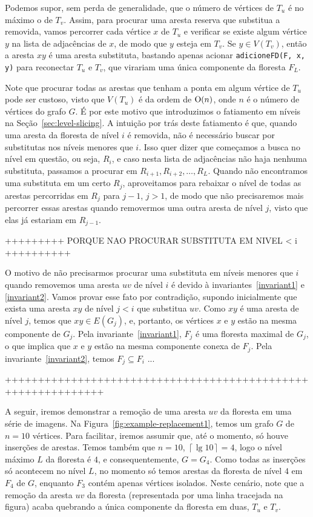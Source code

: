 Podemos supor, sem perda de generalidade, que o número de vértices de $T_u$ é no máximo o de $T_v$. Assim, para procurar uma aresta reserva que substitua a removida, vamos percorrer cada vértice $x$ de $T_u$ e verificar se existe algum vértice $y$ na lista de adjacências de $x$, de modo que $y$ esteja em $T_v$. Se $y \in V(T_v)$, então a aresta $xy$ é uma aresta substituta, bastando apenas acionar \texttt{adicioneFD(F, x, y)} para reconectar $T_u$ e $T_v$, que virariam uma única componente da floresta $F_L$.

Note que procurar todas as arestas que tenham a ponta em algum vértice de $T_u$ pode ser custoso, visto que $V(T_u)$ é da ordem de $\mathrm{O}(n)$, onde $n$ é o número de vértices do grafo $G$. É por este motivo que introduzimos o fatiamento em níveis na Seção~\ref{sec:level-slicing}. A intuição por trás deste fatiamento é que, quando uma aresta da floresta de nível $i$ é removida, não é necessário buscar por substitutas nos níveis menores que $i$. Isso quer dizer que começamos a busca no nível em questão, ou seja, $R_i$, e caso nesta lista de adjacências não haja nenhuma substituta, passamos a procurar em $R_{i+1}, R_{i + 2}, \ldots, R_L$. Quando não encontramos uma substituta em um certo $R_j$, aproveitamos para rebaixar o nível de todas as arestas percorridas em $R_j$ para $j - 1$, $j > 1$, de modo que não precisaremos mais percorrer essas arestas quando removermos uma outra aresta de nível $j$, visto que elas já estariam em $R_{j-1}$.

+++++++++ PORQUE NAO PROCURAR SUBSTITUTA EM NIVEL < i ++++++++++

O motivo de não precisarmos procurar uma substituta em níveis menores que $i$ quando removemos uma aresta $uv$ de nível $i$ é devido à invariantes~\ref{invariant1} e \ref{invariant2}. Vamos provar esse fato por contradição, supondo inicialmente que exista uma aresta $xy$ de nível $j < i$ que substitua $uv$. Como $xy$ é uma aresta de nível $j$, temos que $xy \in E(G_{j})$, e, portanto, os vértices $x$ e $y$ estão na mesma componente de $G_j$. Pela invariante~\ref{invariant1}, $F_j$ é uma floresta maximal de $G_j$, o que implica que $x$ e $y$ estão na mesma componente conexa de $F_j$. Pela invariante~\ref{invariant2}, temos $F_{j} \subseteq F_{i}$ ... 

+++++++++++++++++++++++++++++++++++++++++++++++++++++++++++++

A seguir, iremos demonstrar a remoção de uma aresta $uv$ da floresta em uma série de imagens. Na Figura~\ref{fig:example-replacement1}, temos um grafo $G$ de $n = 10$ vértices. Para facilitar, iremos assumir que, até o momento, só houve inserções de arestas. Temos também que $n = 10$, $\left\lceil \lg 10 \right\rceil = 4$, logo o nível máximo $L$ da floresta é $4$, e consequentemente, $G = G_4$. Como todas as inserções só acontecem no nível $L$, no momento só temos arestas da floresta de nível $4$ em $F_4$ de $G$, enquanto $F_3$ contém apenas vértices isolados. Neste cenário, note que 
a remoção da aresta $uv$ da floresta (representada por uma linha tracejada na figura) acaba quebrando a única componente da floresta em duas, $T_u$ e $T_v$. 


